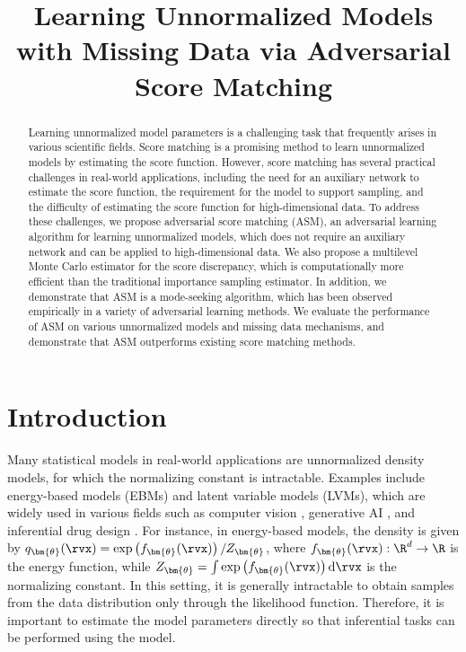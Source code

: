 
\title{Learning Unnormalized Models with Missing Data via Adversarial Score Matching}

\begin{abstract}
Learning unnormalized model parameters is a challenging task that frequently arises in various scientific fields. Score matching is a promising method to learn unnormalized models by estimating the score function. However, score matching has several practical challenges in real-world applications, including the need for an auxiliary network to estimate the score function, the requirement for the model to support sampling, and the difficulty of estimating the score function for high-dimensional data. To address these challenges, we propose adversarial score matching (ASM), an adversarial learning algorithm for learning unnormalized models, which does not require an auxiliary network and can be applied to high-dimensional data. We also propose a multilevel Monte Carlo estimator for the score discrepancy, which is computationally more efficient than the traditional importance sampling estimator. In addition, we demonstrate that ASM is a mode-seeking algorithm, which has been observed empirically in a variety of adversarial learning methods. We evaluate the performance of ASM on various unnormalized models and missing data mechanisms, and demonstrate that ASM outperforms existing score matching methods.
\end{abstract}

\section{Introduction}



Many statistical models in real-world applications are unnormalized density models, for which the normalizing constant is intractable. Examples include energy-based models (EBMs) and latent variable models (LVMs), which are widely used in various fields such as computer vision \citep{Salimans2021}, generative AI \citep{Ho2020}, and inferential drug design \citep{Geffner2023}. For instance, in energy-based models, the density is given by $q_{\bm{\theta}}(\rvx)=\exp\left(f_{\bm{\theta}}(\rvx)\right)/Z_{\bm{\theta}}$, where $f_{\bm{\theta}}(\rvx): \R^d \to \R$ is the energy function, while $Z_{\bm{\theta}}=\int \exp\left(f_{\bm{\theta}}(\rvx)\right) \mathrm{d} \rvx$ is the normalizing constant. In this setting, it is generally intractable to obtain samples from the data distribution only through the likelihood function. Therefore, it is important to estimate the model parameters directly so that inferential tasks can be performed using the model. 

